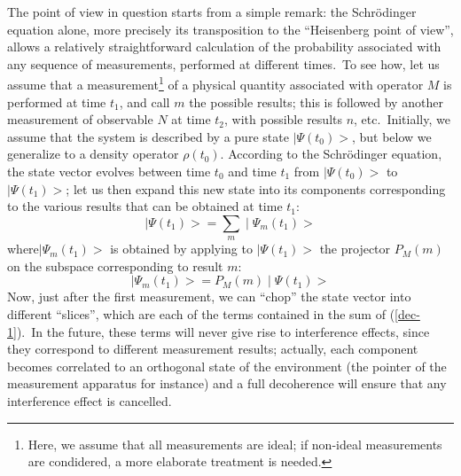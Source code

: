 \documentclass[12pt,onecolumn]{article}%
\begin{document}
The point of view in question starts from a simple remark: the Schr\"{o}dinger
equation alone, more precisely its transposition to the ``Heisenberg point of
view'', allows a relatively straightforward calculation of the probability
associated with any sequence of measurements, performed at different
times.\ To see how, let us assume that a measurement\footnote{Here, we assume
that all measurements are ideal; if non-ideal measurements are condidered, a
more elaborate treatment is needed.} of a physical quantity associated with
operator $M$ is performed at time $t_{1}$, and call $m$ the possible results;
this is followed by another measurement of observable $N$ at time $t_{2}$,
with possible results $n$, etc.\ Initially, we assume that the system is
described by a pure state $\mid\Psi(t_{0})>$, but below we generalize to a
density operator $\rho(t_{0})$. According to the Schr\"{o}dinger equation, the
state vector evolves between time $t_{0}$ and time $t_{1}$ from $\mid
\Psi(t_{0})>$ to $\mid\Psi(t_{1})>$; let us then expand this new state into
its components corresponding to the various results that can be obtained at
time $t_{1}$:%
\begin{equation}
\mid\Psi(t_{1})>=\sum_{m}\mid\Psi_{m}(t_{1})> \label{dec-1}%
\end{equation}
where$\mid\Psi_{m}(t_{1})>$ is obtained by applying to $\mid\Psi(t_{1})>$ the
projector $P_{M}(m)$ on the subspace corresponding to result $m$:
\begin{equation}
\mid\Psi_{m}(t_{1})>=P_{M}(m)\mid\Psi(t_{1})> \label{dec-2}%
\end{equation}
Now, just after the first measurement, we can ``chop'' the state vector into
different ``slices'', which are each of the terms contained in the sum of
(\ref{dec-1}).\ In the future, these terms will never give rise to
interference effects, since they correspond to different measurement results;
actually, each component becomes correlated to an orthogonal state of the
environment (the pointer of the measurement apparatus for instance) and a full
decoherence will ensure that any interference effect is cancelled.
\end{document}
